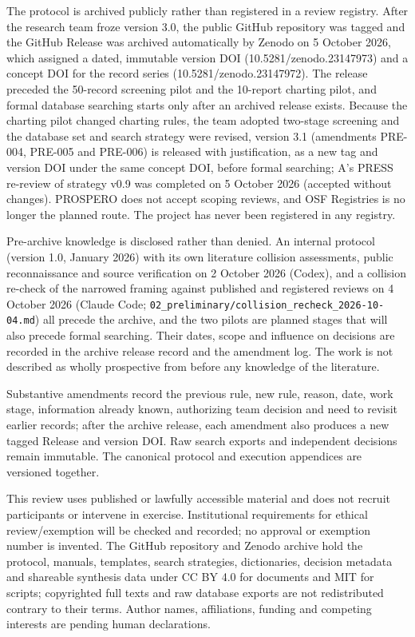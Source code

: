 \documentclass[
  11pt,
  a4paper,
]{article}
\begin{document}
The protocol is archived publicly rather than registered in a review
registry. After the research team froze version 3.0, the public GitHub
repository was tagged and the GitHub Release was archived automatically
by Zenodo on 5 October 2026, which assigned a dated, immutable version
DOI (10.5281/zenodo.23147973) and a concept DOI for the record series
(10.5281/zenodo.23147972). The release preceded the 50-record screening
pilot and the 10-report charting pilot, and formal database searching
starts only after an archived release exists. Because the charting pilot
changed charting rules, the team adopted two-stage screening and the
database set and search strategy were revised, version 3.1 (amendments
PRE-004, PRE-005 and PRE-006) is released with justification, as a new
tag and version DOI under the same concept DOI, before formal searching;
A's PRESS re-review of strategy v0.9 was completed on 5 October 2026
(accepted without changes). PROSPERO does not accept scoping reviews,
and OSF Registries is no longer the planned route. The project has never
been registered in any registry.

Pre-archive knowledge is disclosed rather than denied. An internal
protocol (version 1.0, January 2026) with its own literature collision
assessments, public reconnaissance and source verification on 2 October
2026 (Codex), and a collision re-check of the narrowed framing against
published and registered reviews on 4 October 2026 (Claude Code;
\texttt{02\_preliminary/collision\_recheck\_2026-10-04.md}) all precede
the archive, and the two pilots are planned stages that will also
precede formal searching. Their dates, scope and influence on decisions
are recorded in the archive release record and the amendment log. The
work is not described as wholly prospective from before any knowledge of
the literature.

Substantive amendments record the previous rule, new rule, reason, date,
work stage, information already known, authorizing team decision and
need to revisit earlier records; after the archive release, each
amendment also produces a new tagged Release and version DOI. Raw search
exports and independent decisions remain immutable. The canonical
protocol and execution appendices are versioned together.

This review uses published or lawfully accessible material and does not
recruit participants or intervene in exercise. Institutional
requirements for ethical review/exemption will be checked and recorded;
no approval or exemption number is invented. The GitHub repository and
Zenodo archive hold the protocol, manuals, templates, search strategies,
dictionaries, decision metadata and shareable synthesis data under CC BY
4.0 for documents and MIT for scripts; copyrighted full texts and raw
database exports are not redistributed contrary to their terms. Author
names, affiliations, funding and competing interests are pending human
declarations.
\end{document}
